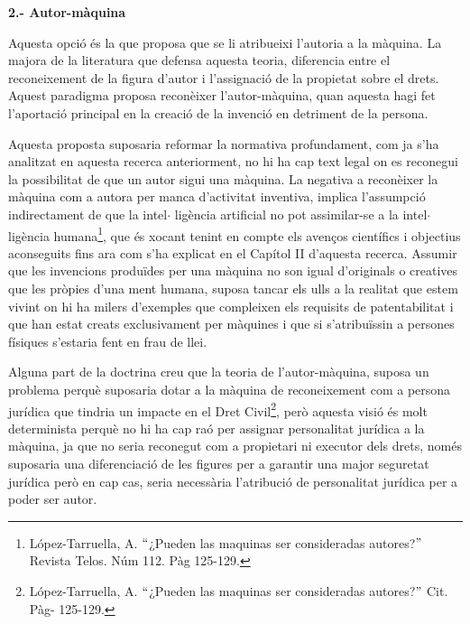 \documentclass[12pt]{article}
\renewcommand{\_}{\kern-1.5pt\textunderscore\kern-1.5pt}
\begin{document}
\begin{itemize}
\vspace{\baselineskip}
\begin{justify}
\textbf{2.- Autor-màquina}
\end{justify}\par


\vspace{\baselineskip}
Aquesta opció és la que proposa que se li atribueixi l’autoria a la màquina. La majora de la literatura que defensa aquesta teoria, diferencia entre el reconeixement de la figura d’autor i l’assignació de la propietat sobre el drets. Aquest paradigma proposa reconèixer l’autor-màquina, quan aquesta hagi fet l’aportació principal en la creació de la invenció en detriment de la persona. \par

Aquesta proposta suposaria reformar la normativa profundament, com ja s’ha analitzat en aquesta recerca anteriorment, no hi ha cap text legal on es reconegui la possibilitat de que un autor sigui una màquina. La negativa a reconèixer la màquina com a autora per manca d’activitat inventiva, implica l’assumpció indirectament de que la intel$ \cdot $ ligència artificial no pot assimilar-se a la intel$ \cdot $ ligència humana\footnote{ López-Tarruella, A. $``$¿Pueden las maquinas ser consideradas autores?$"$  Revista Telos. Núm 112. Pàg 125-129. }, que és xocant tenint en compte els avenços científics i objectius aconseguits fins ara com s’ha explicat en el Capítol II d’aquesta recerca. Assumir que les invencions produïdes per una màquina no son igual d’originals o creatives que les pròpies d’una ment humana, suposa tancar els ulls a la realitat que estem vivint on hi ha milers d’exemples que compleixen els requisits de patentabilitat i que han estat creats exclusivament per màquines i que si s’atribuïssin a persones físiques s’estaria fent en frau de llei. \par


\vspace{\baselineskip}
Alguna part de la doctrina creu que la teoria de l’autor-màquina, suposa un problema perquè suposaria dotar a la màquina de reconeixement com a persona jurídica que tindria un impacte en el Dret Civil\footnote{ López-Tarruella, A. $``$¿Pueden las maquinas ser consideradas autores?$"$  Cit. Pàg- 125-129. }, però aquesta visió és molt determinista perquè no hi ha cap raó per assignar personalitat jurídica a la màquina, ja que no seria reconegut com a propietari ni executor dels drets, només suposaria una diferenciació de les figures per a garantir una major seguretat jurídica però en cap cas, seria necessària l’atribució de personalitat jurídica per a poder ser autor.  \par



\end{itemize}
\end{document}
